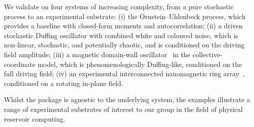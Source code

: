 We validate on four systems of increasing complexity, from a pure stochastic process to an experimental substrate: (i) the Ornstein–Uhlenbeck process, which provides a baseline with closed-form moments and autocorrelation; (ii) a driven stochastic Duffing oscillator with combined white and coloured noise, which is non-linear, stochastic, and potentially chaotic, and is conditioned on the driving field amplitude; (iii) a magnetic domain-wall oscillator~\cite{ababei2021} in the collective-coordinate model, which is phenomenologically Duffing-like, conditioned on the full driving field; (iv) an experimental interconnected nanomagnetic ring array~\cite{vidamour2022}, conditioned on a rotating in-plane field.

Whilst the package is agnostic to the underlying system, the examples illustrate a range of experimental substrates of interest to our group in the field of physical reservoir computing.
